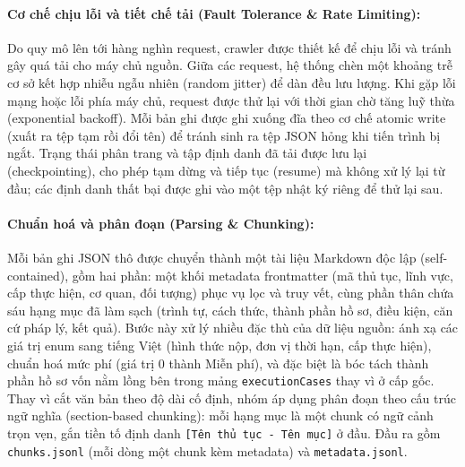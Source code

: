 \documentclass[11pt]{article}
\begin{document}
\paragraph{Cơ chế chịu lỗi và tiết chế tải (Fault Tolerance \& Rate Limiting): }
Do quy mô lên tới hàng nghìn request, crawler được thiết kế để chịu lỗi và tránh gây quá tải
cho máy chủ nguồn. Giữa các request, hệ thống chèn một khoảng trễ cơ sở kết hợp nhiễu ngẫu
nhiên (random jitter) để dàn đều lưu lượng. Khi gặp lỗi mạng hoặc lỗi phía máy chủ, request
được thử lại với thời gian chờ tăng luỹ thừa (exponential backoff). Mỗi bản ghi được ghi
xuống đĩa theo cơ chế atomic write (xuất ra tệp tạm rồi đổi tên) để tránh sinh ra tệp JSON
hỏng khi tiến trình bị ngắt. Trạng thái phân trang và tập định danh đã tải được lưu lại
(checkpointing), cho phép tạm dừng và tiếp tục (resume) mà không xử lý lại từ đầu; các định
danh thất bại được ghi vào một tệp nhật ký riêng để thử lại sau.


\paragraph{Chuẩn hoá và phân đoạn (Parsing \& Chunking): }
Mỗi bản ghi JSON thô được chuyển thành một tài liệu Markdown độc lập (self-contained), gồm
hai phần: một khối metadata frontmatter (mã thủ tục, lĩnh vực, cấp thực hiện, cơ quan, đối
tượng) phục vụ lọc và truy vết, cùng phần thân chứa sáu hạng mục đã làm sạch (trình tự, cách
thức, thành phần hồ sơ, điều kiện, căn cứ pháp lý, kết quả). Bước này xử lý nhiều đặc thù của
dữ liệu nguồn: ánh xạ các giá trị enum sang tiếng Việt (hình thức nộp, đơn vị thời hạn, cấp
thực hiện), chuẩn hoá mức phí (giá trị 0 thành Miễn phí), và đặc biệt là bóc tách thành phần
hồ sơ vốn nằm lồng bên trong mảng \texttt{executionCases} thay vì ở cấp gốc. Thay vì cắt văn
bản theo độ dài cố định, nhóm áp dụng phân đoạn theo cấu trúc ngữ nghĩa (section-based
chunking): mỗi hạng mục là một chunk có ngữ cảnh trọn vẹn, gắn tiền tố định danh
\texttt{[Tên thủ tục - Tên mục]} ở đầu. Đầu ra gồm \texttt{chunks.jsonl} (mỗi dòng một chunk
kèm metadata) và \texttt{metadata.jsonl}.

\end{document}
